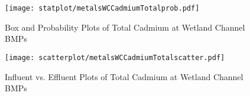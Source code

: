         \begin{figure}[hb]   %
            \centering
            \texttt{[image: statplot/metalsWCCadmiumTotalprob.pdf]}
            \caption{Box and Probability Plots of Total Cadmium at Wetland Channel BMPs}
        \end{figure}         %
        
        
        \begin{figure}[hb]   %
            \centering
            \texttt{[image: scatterplot/metalsWCCadmiumTotalscatter.pdf]}
            \caption{Influent vs. Effluent Plots of Total Cadmium at Wetland Channel BMPs}
        \end{figure}         %
        \clearpage
        